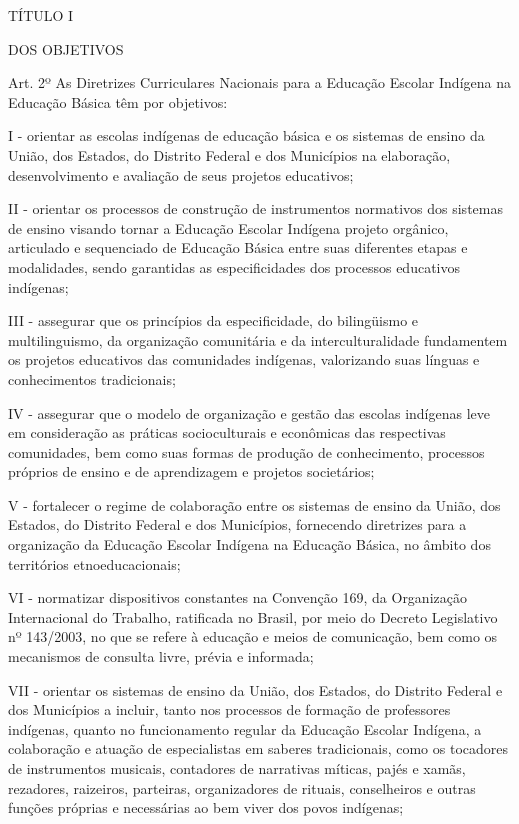 \documentclass[
]{book}
\begin{document}
TÍTULO I

DOS OBJETIVOS

Art. 2º As Diretrizes Curriculares Nacionais para a Educação Escolar Indígena na Educação Básica têm por objetivos:

I - orientar as escolas indígenas de educação básica e os sistemas de ensino da União, dos Estados, do Distrito Federal e dos Municípios na elaboração, desenvolvimento e avaliação de seus projetos educativos;

II - orientar os processos de construção de instrumentos normativos dos sistemas de ensino visando tornar a Educação Escolar Indígena projeto orgânico, articulado e sequenciado de Educação Básica entre suas diferentes etapas e modalidades, sendo garantidas as especificidades dos processos educativos indígenas;

III - assegurar que os princípios da especificidade, do bilingüismo e multilinguismo, da organização comunitária e da interculturalidade fundamentem os projetos educativos das comunidades indígenas, valorizando suas línguas e conhecimentos tradicionais;

IV - assegurar que o modelo de organização e gestão das escolas indígenas leve em consideração as práticas socioculturais e econômicas das respectivas comunidades, bem como suas formas de produção de conhecimento, processos próprios de ensino e de aprendizagem e projetos societários;

V - fortalecer o regime de colaboração entre os sistemas de ensino da União, dos Estados, do Distrito Federal e dos Municípios, fornecendo diretrizes para a organização da Educação Escolar Indígena na Educação Básica, no âmbito dos territórios etnoeducacionais;

VI - normatizar dispositivos constantes na Convenção 169, da Organização Internacional do Trabalho, ratificada no Brasil, por meio do Decreto Legislativo nº 143/2003, no que se refere à educação e meios de comunicação, bem como os mecanismos de consulta livre, prévia e informada;

VII - orientar os sistemas de ensino da União, dos Estados, do Distrito Federal e dos Municípios a incluir, tanto nos processos de formação de professores indígenas, quanto no funcionamento regular da Educação Escolar Indígena, a colaboração e atuação de especialistas em saberes tradicionais, como os tocadores de instrumentos musicais, contadores de narrativas míticas, pajés e xamãs, rezadores, raizeiros, parteiras, organizadores de rituais, conselheiros e outras funções próprias e necessárias ao bem viver dos povos indígenas;
\end{document}
